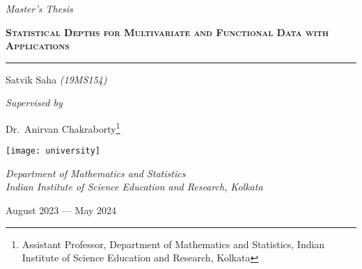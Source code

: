 \begin{titlepage}
    \vspace*{2cm}
    \centering

    {\noindent\huge\itshape\color{black!70!white}
        Master's Thesis
    }
    \vspace{0.2cm}

    {\noindent\Huge\scshape\bfseries{}%
        Statistical Depths for Multivariate and Functional Data with Applications\par
    }

    \vspace{0.8cm}
    \hrule
    \vspace{0.4cm}

    {\noindent\Large Satvik Saha \textcolor{black!70!white}{\textit{(19MS154)}}}
    \vspace{0.6cm}

    {\noindent\Large\itshape Supervised by}
    \vspace{0.1cm}

    \renewcommand*{\thefootnote}{\fnsymbol{footnote}}
    {\noindent\Large Dr.~Anirvan Chakraborty\footnote{Assistant Professor, Department of Mathematics and Statistics, Indian Institute of Science Education and Research, Kolkata}}
    \renewcommand*{\thefootnote}{\arabic{footnote}}
    \setcounter{footnote}{0}

    \vfill

    \noindent\texttt{[image: university]}

    \vspace{0.2cm}

    {\noindent\large\itshape
        Department of Mathematics and Statistics \vspace{0.2em}\\
        Indian Institute of Science Education and Research, Kolkata \\
    }
    \vspace{0.8cm}

    {\noindent\large August 2023 \;---\; May 2024}

    \vspace*{2cm}
\end{titlepage}
